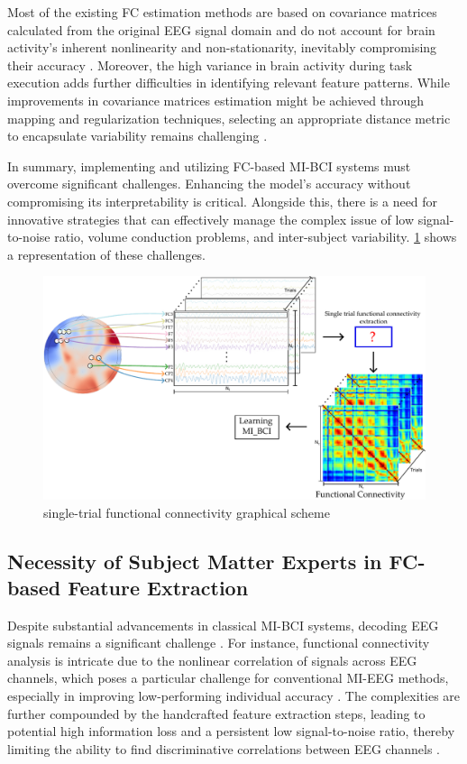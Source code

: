 Most of the existing FC estimation methods are based on covariance matrices calculated from the original EEG signal domain and do not account for brain activity's inherent nonlinearity and non-stationarity, inevitably compromising their accuracy \cite{miladinovic2021effect}. Moreover, the high variance in brain activity during task execution adds further difficulties in identifying relevant feature patterns. While improvements in covariance matrices estimation might be achieved through mapping and regularization techniques, selecting an appropriate distance metric to encapsulate variability remains challenging \cite{wang2020diverse,congedo2017fixed}.

In summary, implementing and utilizing FC-based MI-BCI systems must overcome significant challenges. Enhancing the model's accuracy without compromising its interpretability is critical. Alongside this, there is a need for innovative strategies that can effectively manage the complex issue of low signal-to-noise ratio, volume conduction problems, and inter-subject variability. \cref{fig:problem_1} shows a representation of these challenges.

\begin{figure}[!h]
    \centering
    \includegraphics[width=0.9\linewidth]{Figures/Objective_1/problem1.pdf}
    \caption{single-trial functional connectivity graphical scheme}\label{fig:problem_1}
\end{figure}

\subsection{Necessity of Subject Matter Experts in FC-based Feature Extraction}

Despite substantial advancements in classical MI-BCI systems, decoding EEG signals remains a significant challenge \cite{rashid2020current}. For instance, functional connectivity analysis is intricate due to the nonlinear correlation of signals across EEG channels, which poses a particular challenge for conventional MI-EEG methods, especially in improving low-performing individual accuracy \cite{ismail2020graph,wang2020diverse,congedo2017fixed}. The complexities are further compounded by the handcrafted feature extraction steps, leading to potential high information loss and a persistent low signal-to-noise ratio, thereby limiting the ability to find discriminative correlations between EEG channels \cite{altaheri2023deep}.

